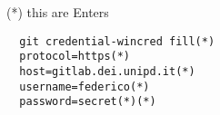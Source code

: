 (*) this are Enters

\begin{lstlisting}
  git credential-wincred fill(*)
  protocol=https(*)
  host=gitlab.dei.unipd.it(*)
  username=federico(*)
  password=secret(*)(*)
\end{lstlisting}
